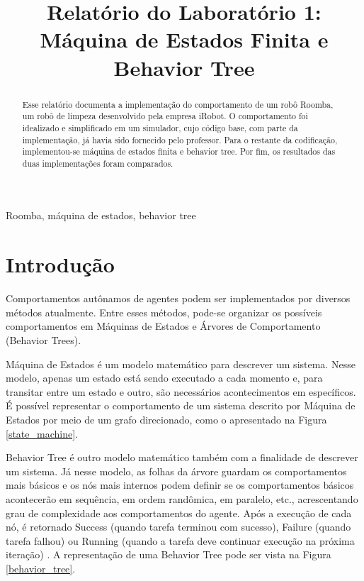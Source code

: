\documentclass[conference]{IEEEtran}
\begin{document}
\title{Relatório do Laboratório 1: \\ Máquina de Estados Finita e Behavior Tree\\
}

\author{
}

\maketitle

\begin{abstract}
Esse relatório documenta a implementação do comportamento de um robô Roomba, um robô de limpeza desenvolvido pela empresa iRobot. O comportamento foi idealizado e simplificado em um simulador, cujo código base, com parte da implementação, já havia sido fornecido pelo professor. Para o restante da codificação, implementou-se máquina de estados finita e behavior tree. Por fim, os resultados das duas implementações foram comparados.
\end{abstract}

\begin{IEEEkeywords}
Roomba, máquina de estados, behavior tree
\end{IEEEkeywords}

\section{Introdução}
Comportamentos autônamos de agentes podem ser implementados por diversos métodos atualmente. Entre esses métodos, pode-se organizar os possíveis comportamentos em Máquinas de Estados e Árvores de Comportamento (Behavior Trees).

Máquina de Estados é um modelo matemático para descrever um sistema. Nesse modelo, apenas um estado está sendo executado a cada momento e, para transitar entre um estado e outro, são necessários acontecimentos em específicos\cite{b1}. É possível representar o comportamento de um sistema descrito por Máquina de Estados por meio de um grafo direcionado, como o apresentado na Figura \ref{state_machine}.

Behavior Tree é outro modelo matemático também com a finalidade de descrever um sistema. Já nesse modelo, as folhas da árvore guardam os comportamentos mais básicos e os nós mais internos podem definir se os comportamentos básicos acontecerão em sequência, em ordem randômica, em paralelo, etc., acrescentando grau de complexidade aos comportamentos do agente. Após a execução de cada nó, é retornado Success (quando tarefa terminou com sucesso), Failure (quando tarefa falhou) ou Running (quando a tarefa deve continuar execução na próxima iteração) \cite{b1}. A representação de uma Behavior Tree pode ser vista na Figura \ref{behavior_tree}.
\end{document}
